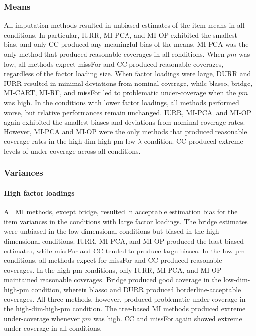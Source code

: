 	\subsubsection{Means}
	All imputation methods resulted in unbiased estimates of the item means in all conditions.
	In particular, IURR, MI-PCA, and MI-OP exhibited the smallest bias, and only CC produced any meaningful 
	bias of the means. MI-PCA was the only method that produced reasonable coverages in all conditions. When $pm$ was low, all methods expect missFor and CC produced reasonable coverages, regardless of the factor loading size.
	When factor loadings were large, DURR and IURR resulted in minimal deviations from nominal 
	coverage, while blasso, bridge, MI-CART, MI-RF, and missFor led to problematic under-coverage when the $pm$ was high.
	In the conditions with lower factor loadings, all methods performed worse, but relative performances remain
	unchanged.
	IURR, MI-PCA, and MI-OP again exhibited the smallest biases and deviations from nominal coverage rates.
	However, MI-PCA and MI-OP were the only methods that produced reasonable coverage rates in the 
	high-dim-high-pm-low-$\lambda$ condition. CC produced extreme levels of under-coverage across all conditions.
	
	\subsubsection{Variances}
	
	\paragraph{High factor loadings} 
	All MI methods, except bridge, resulted in acceptable estimation bias for the item variances in the conditions
	with large factor loadings. The bridge estimates were unbiased in the low-dimensional conditions but biased in the high-dimensional conditions.
	IURR, MI-PCA, and MI-OP produced the least biased estimates, while missFor and CC tended to produce large biases.
	In the low-pm conditions, all methods expect for missFor and CC produced reasonable coverages. In the high-pm conditions, only IURR, MI-PCA, and MI-OP maintained reasonable coverages. Bridge produced good coverage in the low-dim-high-pm condition, wherein blasso and DURR produced borderline-acceptable coverages. All three methods, however, produced problematic under-coverage in the high-dim-high-pm condition. The tree-based MI methods produced extreme under-coverage whenever $pm$ was high.
	CC and missFor again showed extreme under-coverage in all conditions.

